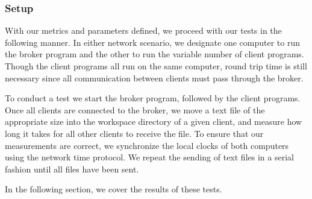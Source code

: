 \subsubsection{Setup}
With our metrics and parameters defined,
we proceed with our tests in the following manner.
In either network scenario,
we designate one computer to run the broker program
and the other to run the variable number of client programs.
Though the client programs all run on the same computer,
round trip time is still necessary since all communication
between clients must pass through the broker.

To conduct a test we start the broker program, followed by the
client programs.
Once all clients are connected to the broker,
we move a text file of the appropriate
size into the workspace directory of a given client,
and measure how long it takes for all other clients
to receive the file.
To ensure that our measurements are correct,
we synchronize the local clocks of both computers
using the network time protocol.
We repeat the sending of text files in a serial fashion
until all files have been sent.

In the following section, we cover the results of these tests.

